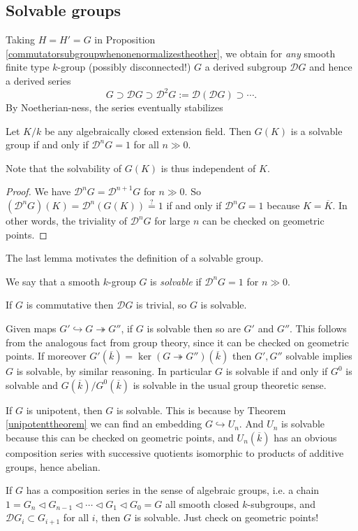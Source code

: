 \documentclass[10pt]{article}
\newcommand{\sD}{\mathscr{D}}
\newcommand{\nsg}{\vartriangleleft}
\renewcommand{\(}{\left(}
\renewcommand{\)}{\right)}
\renewcommand{\bar}{\overline}
\newcommand{\into}{\hookrightarrow}
\newcommand{\onto}{\twoheadrightarrow }
\numberwithin{thm}{subsection}
\begin{document}
\subsection{Solvable groups}
Taking $H=H'=G$ in Proposition \ref{commutatorsubgroupwhenonenormalizestheother},
we obtain for \textit{any} smooth finite type $k$-group (possibly disconnected!) $G$
a derived subgroup $\sD G$
and hence a derived series
\[G\supset \sD G\supset \sD^2G:=\sD(\sD G)\supset\cdots.\]
By Noetherian-ness, the series eventually stabilizes
\begin{lem}
Let $K/k$ be any algebraically closed extension field.
Then $G(K)$ is a solvable group if and only if $\sD^nG=1$ for all $n\gg 0$.
\end{lem}
\begin{rem}Note that the solvability of $G(K)$ is thus independent of $K$.
\end{rem}
\begin{proof}
We have $\sD^n G=\sD^{n+1}G$ for $n\gg 0$.
So $(\sD^nG)(K)=\sD^n(G(K))\stackrel{?}{=}1$
if and only if $\sD^nG=1$ because $K=\bar K$.
In other words, the triviality of $\sD^nG$ for large $n$
can be checked on geometric points.
\end{proof}
The last lemma motivates the definition of a solvable group.
\begin{defn}
We say that a smooth $k$-group $G$ is \textit{solvable}
if $\sD^nG=1$ for $n\gg0$.
\end{defn}
\begin{ex}
If $G$ is commutative then $\sD G$ is trivial,
so $G$ is solvable.
\end{ex}
\begin{ex}
Given maps $G'\into G \onto G''$,
if $G$ is solvable then so are $G'$ and $G''$.
This follows from the analogous fact from group theory,
since it can be checked on geometric points.
If moreover $G'(\bar k)=\ker(G\onto G'')(\bar k)$
then $G',G''$ solvable implies
$G$ is solvable, by similar reasoning.
In particular
$G$ is solvable if and only if $G^0$ is solvable
and $G(\bar k)/G^0(\bar k)$ is solvable in the usual group theoretic sense.
\end{ex}
\begin{ex}
If $G$ is unipotent, then $G$ is solvable.
This is because by Theorem \ref{unipotenttheorem}
we can find an embedding $G\into U_n$.
And $U_n$ is solvable because this can be checked on geometric points,
and $U_n(\bar k)$ has an obvious composition
series
with successive quotients
isomorphic to products of additive groups,
hence abelian.
\end{ex}
\begin{ex}
If $G$ has a composition series in the sense
of algebraic groups,
i.e. a chain
$1=G_n\nsg G_{n-1}\nsg \cdots\nsg G_1\nsg G_0=G$
all smooth closed $k$-subgroups,
and $\sD G_i\subset G_{i+1}$ for all $i$,
then $G$ is solvable. Just check on geometric points!
\end{ex}
\end{document}
